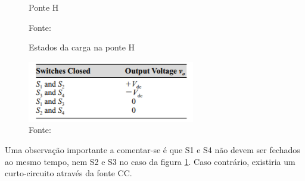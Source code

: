 \begin{figure}[H]
    \centering
     \caption{Ponte H}
     \caption*{Fonte:\cite{hart2011power}}\label{fig:ponteh1}
\end{figure}

\begin{figure}[H]
    \centering
     \caption{Estados da carga na ponte H}
     \includegraphics[width=0.65\textwidth]{./img/hart1.png}
     \caption*{Fonte: \cite{hart2011power}}
     \label{fig:hart1}
\end{figure}

Uma observação importante a comentar-se é que S1 e S4 não devem ser fechados ao mesmo tempo, nem S2 e S3 no caso da figura \ref{fig:ponteh1}. Caso contrário, existiria um curto-circuito através da fonte CC. \cite{hart2011power}


